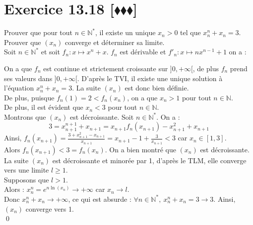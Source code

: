 \documentclass[10pt]{article}
\begin{document}
\section*{Exercice 13.18 [$\blacklozenge\blacklozenge\blacklozenge$]}
\begin{tcolorbox}[enhanced, width=7.6in, center, size=fbox, fontupper=\large, drop shadow southwest]
    Prouver que pour tout $n\in\mathbb{N}^*$, il existe un unique $x_n>0$ tel que $x^n_n + x_n = 3$. Prouver que $(x_n)$ converge et déterminer sa limite.\\
    Soit $n\in\mathbb{N}^*$ et soit $f_n : x\mapsto x^n + x$. $f_n$ est dérivable et $f'_n: x \mapsto nx^{n-1} + 1$ on a :
    \begin{center}
    \end{center}
    On a que $f_n$ est continue et strictement croissante sur $]0, +\infty[$, de plus $f_n$ prend ses valeurs dans $]0, +\infty[$. D'après le TVI, il existe une unique solution à l'équation $x_n^n +x_n = 3$. La suite $(x_n)$ est donc bien définie.\\
    De plus, puisque $f_n(1)=2<f_n(x_n)$, on a que $x_n>1$ pour tout $n\in\mathbb{N}$.\\
    De plus, il est évident que $x_n<3$ pour tout $n\in\mathbb{N}$.\\
    Montrons que $(x_n)$ est décroissante. Soit $n\in\mathbb{N}^*$. On a :
    \begin{equation*}
        3 = x^{n+1}_{n+1}+x_{n+1} = x_{n+1}f_n(x_{n+1}) - x_{n+1}^2 + x_{n+1}
    \end{equation*}
    Ainsi, $f_n(x_{n+1})=\frac{3 +x_{n+1}^2  - x_{n+1}}{x_{n+1}}=x_{n+1} - 1 + \frac{3}{x_{n+1}}<3$ car $x_n\in[1,3]$.\\
    Alors $f_n(x_{n+1})<3=f_n(x_n)$. On a bien montré que $(x_n)$ est décroissante.\\
    La suite $(x_n)$ est décroissante et minorée par 1, d'après le TLM, elle converge vers une limite $l\geq1$.\\
    Supposons que $l>1$.\\
    Alors : $x_n^n = e^{n\ln(x_n)} \to +\infty$ car $x_n \to l$.\\
    Donc $x_n^n + x_n \to +\infty$, ce qui est absurde : $\forall n \in \mathbb{N}^*, ~ x_n^n + x_n = 3 \to 3$.
    Ainsi, $(x_n)$ converge vers 1.\\
    \qed
\end{tcolorbox}
\end{document}
